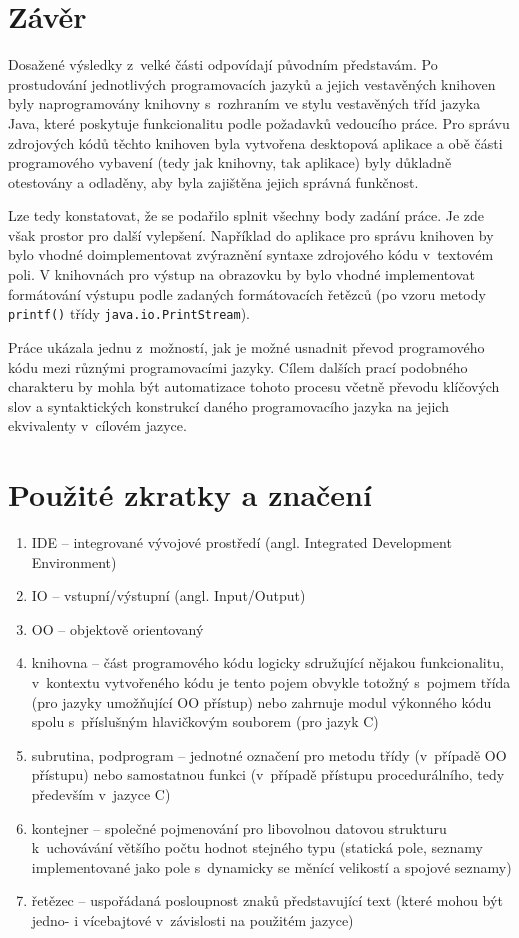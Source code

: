 \documentclass[czech,BP]{thesiskiv}
\begin{document}
\chapter{Závěr}
Dosažené výsledky z~velké části odpovídají původním představám. Po prostudování jednotlivých programovacích jazyků a jejich vestavěných knihoven byly naprogramovány knihovny s~rozhraním ve stylu vestavěných tříd jazyka Java, které poskytuje funkcionalitu podle požadavků vedoucího práce. Pro správu zdrojových kódů těchto knihoven byla vytvořena desktopová aplikace a obě části programového vybavení (tedy jak knihovny, tak aplikace) byly důkladně otestovány a odladěny, aby byla zajištěna jejich správná funkčnost.\par
Lze tedy konstatovat, že se podařilo splnit všechny body zadání práce. Je zde však prostor pro další vylepšení. Například do aplikace pro správu knihoven by bylo vhodné doimplementovat zvýraznění syntaxe zdrojového kódu v~textovém poli. V knihovnách pro výstup na obrazovku by bylo vhodné implementovat formátování výstupu podle zadaných formátovacích řetězců (po vzoru metody \texttt{printf()} třídy \texttt{java.io.PrintStream}).\par
Práce ukázala jednu z~možností, jak je možné usnadnit převod programového kódu mezi různými programovacími jazyky. Cílem dalších prací podobného charakteru by mohla být automatizace tohoto procesu včetně převodu klíčových slov a syntaktických konstrukcí daného programovacího jazyka na jejich ekvivalenty v~cílovém jazyce.

% 
%

{\raggedright\small

}

\chapter*{Použité zkratky a značení}
\begin{enumerate}
\item{IDE -- integrované vývojové prostředí (angl. Integrated Development Environment)}
\item{IO -- vstupní/výstupní (angl. Input/Output)}
\item{OO -- objektově orientovaný}
\item{knihovna -- část programového kódu logicky sdružující nějakou funkcionalitu, v~kontextu vytvořeného kódu je tento pojem obvykle totožný s~pojmem třída (pro jazyky umožňující OO přístup) nebo zahrnuje modul výkonného kódu spolu s~příslušným hlavičkovým souborem (pro jazyk C)}
\item{subrutina, podprogram -- jednotné označení pro metodu třídy (v~případě OO přístupu) nebo samostatnou funkci (v~případě přístupu procedurálního, tedy především v~jazyce C)}
\item{kontejner -- společné pojmenování pro libovolnou datovou strukturu k~uchovávání většího počtu hodnot stejného typu (statická pole, seznamy implementované jako pole s~dynamicky se měnící velikostí a spojové seznamy)}
\item{řetězec -- uspořádaná posloupnost znaků představující text (které mohou být jedno- i vícebajtové v~závislosti na použitém jazyce)}
\end{enumerate}
\end{document}
